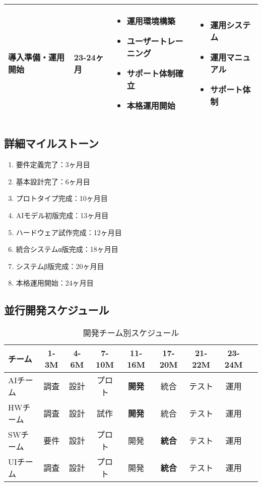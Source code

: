 \documentclass[12pt,a4paper]{jsarticle}
\begin{document}
\begin{longtable}{|p{3cm}|p{2.5cm}|p{6cm}|p{3cm}|}
導入準備・運用開始 & 23-24ヶ月 & 
\begin{itemize}
\item 運用環境構築
\item ユーザートレーニング
\item サポート体制確立
\item 本格運用開始
\end{itemize} & 
\begin{itemize}
\item 運用システム
\item 運用マニュアル
\item サポート体制
\end{itemize} \\
\hline
\end{longtable}

\subsection{詳細マイルストーン}
\begin{enumerate}
    \item 要件定義完了：3ヶ月目
    \item 基本設計完了：6ヶ月目
    \item プロトタイプ完成：10ヶ月目
    \item AIモデル初版完成：13ヶ月目
    \item ハードウェア試作完成：12ヶ月目
    \item 統合システムα版完成：18ヶ月目
    \item システムβ版完成：20ヶ月目
    \item 本格運用開始：24ヶ月目
\end{enumerate}

\subsection{並行開発スケジュール}
\begin{table}[h]
\centering
\caption{開発チーム別スケジュール}
\begin{tabular}{|l|c|c|c|c|c|c|c|c|}
\hline
\textbf{チーム} & \textbf{1-3M} & \textbf{4-6M} & \textbf{7-10M} & \textbf{11-16M} & \textbf{17-20M} & \textbf{21-22M} & \textbf{23-24M} \\
\hline
AIチーム & 調査 & 設計 & プロト & \textbf{開発} & 統合 & テスト & 運用 \\
\hline
HWチーム & 調査 & 設計 & 試作 & \textbf{開発} & 統合 & テスト & 運用 \\
\hline
SWチーム & 要件 & 設計 & プロト & 開発 & \textbf{統合} & テスト & 運用 \\
\hline
UIチーム & 調査 & 設計 & プロト & 開発 & \textbf{統合} & テスト & 運用 \\
\hline
\end{tabular}
\end{table}
\end{document}
